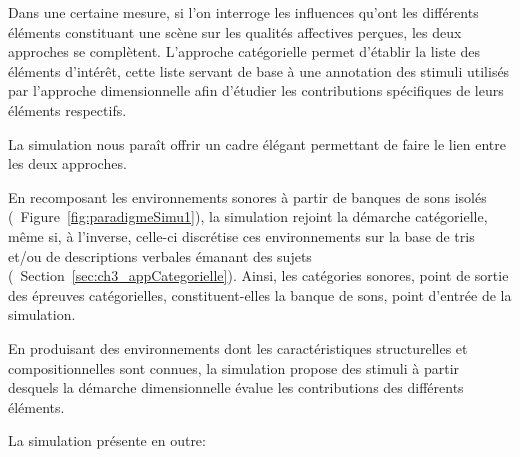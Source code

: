 Dans une certaine mesure, si l'on interroge les influences qu'ont les différents éléments constituant une scène sur les qualités affectives perçues, les deux approches se complètent. L'approche catégorielle permet d'établir la liste des éléments d'intérêt, cette liste servant de base à une annotation des stimuli utilisés par l'approche dimensionnelle afin d'étudier les contributions spécifiques de leurs éléments respectifs.

La simulation nous paraît offrir un cadre élégant permettant de faire le lien entre les deux approches.

En recomposant les environnements sonores à partir de banques de sons isolés (\cf~Figure~\ref{fig:paradigmeSimu1}), la simulation rejoint la démarche catégorielle, même si, à l'inverse, celle-ci discrétise ces environnements sur la base de tris et/ou de descriptions verbales émanant des sujets (\cf~Section~\ref{sec:ch3_appCategorielle}). Ainsi, les catégories sonores, point de sortie des épreuves catégorielles, constituent-elles la banque de sons, point d'entrée de la simulation.

En produisant des environnements dont les caractéristiques structurelles et compositionnelles sont connues, la simulation propose des stimuli à partir desquels la démarche dimensionnelle évalue les contributions des différents éléments.

La simulation présente en outre:

